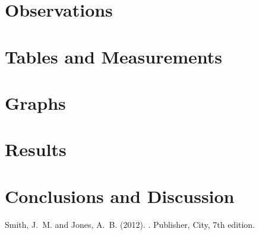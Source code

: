 \documentclass{article}
\begin{document}

\section{Observations}



\section{Tables and Measurements}



\section{Graphs}



\section{Results}



\section{Conclusions and Discussion}




\begin{thebibliography}{9}

Smith, J.~M. and Jones, A.~B. (2012).
.
\newblock Publisher, City, 7th edition.

\end{thebibliography}
\end{document}
